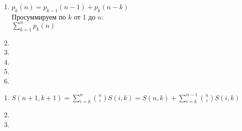\begin{enumerate}
  \item
    $p_k(n) = p_{k-1}(n-1) + p_k(n-k)$\\
    Просуммируем по $k$ от 1 до $n$:\\
    $\sum\limits_{k=1}^{n} p_k(n)$
  
  \item
  
  \item
  
  \item
  
  \item
  
  \item
\end{enumerate}


\begin{enumerate}
  \item
    $S(n+1,k+1) = \sum\limits_{i=k}^{n}{n \choose i}S(i,k) = S(n,k) + \sum\limits_{i=k}^{n-1}{n \choose i} S(i,k)$ 
    
  \item
  

  \item

  
\end{enumerate}